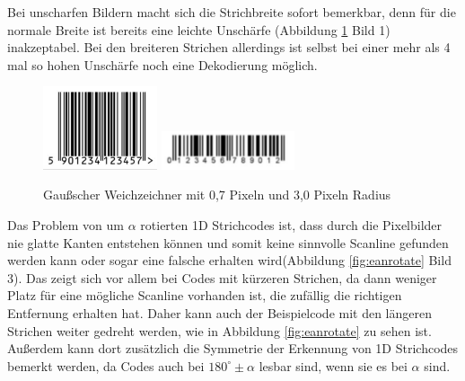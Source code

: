 Bei unscharfen Bildern macht sich die Strichbreite sofort bemerkbar, denn für die normale Breite ist bereits eine leichte Unschärfe (Abbildung \ref*{fig:eanblurry} Bild 1) inakzeptabel. Bei den breiteren Strichen allerdings ist selbst bei einer mehr als 4 mal so hohen Unschärfe noch eine Dekodierung möglich.
\begin{figure}[H]
  \centering
  \includegraphics[width=0.30\textwidth]{img/EAN13/blurry_01_07.jpg}
  \includegraphics[width=0.35\textwidth]{img/EAN13/blurry_02_3.jpg}
  \caption{Gaußscher Weichzeichner mit 0,7 Pixeln und 3,0 Pixeln Radius}
  \label{fig:eanblurry}
\end{figure}

Das Problem von um $\alpha$ rotierten 1D Strichcodes ist, dass durch die Pixelbilder nie glatte Kanten entstehen können und somit keine sinnvolle Scanline gefunden werden kann oder sogar eine falsche erhalten wird(Abbildung \ref*{fig:eanrotate} Bild 3). Das zeigt sich vor allem bei Codes mit kürzeren Strichen, da dann weniger Platz für eine mögliche Scanline vorhanden ist, die zufällig die richtigen Entfernung erhalten hat. Daher kann auch der Beispielcode mit den längeren Strichen weiter gedreht werden, wie in Abbildung \ref*{fig:eanrotate} zu sehen ist. Außerdem kann dort zusätzlich die Symmetrie der Erkennung von 1D Strichcodes bemerkt werden, da Codes auch bei $180^\circ \pm \alpha$ lesbar sind, wenn sie es bei $\alpha$ sind.

